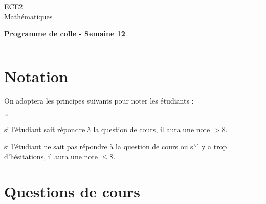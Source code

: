 \documentclass[11pt]{article}%
\begin{document}
\begin{flushleft}
ECE2 \\
Mathématiques
\end{flushleft}


\vspace{0.1cm}

\begin{center}
\textbf{\Large{Programme de colle - Semaine 12}}
\end{center}

\hrule

\vspace*{0,2cm}

\section*{Notation}

\noindent
On adoptera les principes suivants pour noter les étudiants :
\begin{noliste}{$\scriptstyle \times$}
\item si l'étudiant sait répondre à la question de cours, il 
aura une note $>8$.
\item si l'étudiant ne sait pas répondre à la question de 
cours ou s'il y a trop d'hésitations, il aura une note $\leq 8$.
\end{noliste}

\section*{Questions de cours}
\end{document}
